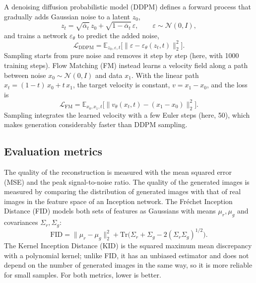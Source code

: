 A denoising diffusion probabilistic model (DDPM) \cite{Ho2020} defines a forward process that gradually adds Gaussian noise to a latent $z_0$,
\begin{equation}
z_t=\sqrt{\bar{\alpha}_t}\,z_0+\sqrt{1-\bar{\alpha}_t}\,\varepsilon,\qquad \varepsilon\sim\mathcal{N}(0,I),
\end{equation}
and trains a network $\varepsilon_\theta$ to predict the added noise,
\begin{equation}
\mathcal{L}_{\mathrm{DDPM}}=\mathbb{E}_{z_0,\varepsilon,t}\big[\lVert\varepsilon-\varepsilon_\theta(z_t,t)\rVert_2^2\big].
\end{equation}
Sampling starts from pure noise and removes it step by step (here, with 1000 training steps). Flow Matching (FM) \cite{Lipman2023} instead learns a velocity field along a path between noise $x_0\sim\mathcal{N}(0,I)$ and data $x_1$. With the linear path $x_t=(1-t)\,x_0+t\,x_1$, the target velocity is constant, $v=x_1-x_0$, and the loss is
\begin{equation}
\mathcal{L}_{\mathrm{FM}}=\mathbb{E}_{x_0,x_1,t}\big[\lVert v_\theta(x_t,t)-(x_1-x_0)\rVert_2^2\big].
\end{equation}
Sampling integrates the learned velocity with a few Euler steps (here, 50), which makes generation considerably faster than DDPM sampling.

\subsection{Evaluation metrics}

The quality of the reconstruction is measured with the mean squared error (MSE) and the peak signal-to-noise ratio. The quality of the generated images is measured by comparing the distribution of generated images with that of real images in the feature space of an Inception network. The Fr\'echet Inception Distance (FID) \cite{Heusel2017} models both sets of features as Gaussians with means $\mu_r,\mu_g$ and covariances $\Sigma_r,\Sigma_g$:
\begin{equation}
\mathrm{FID}=\lVert\mu_r-\mu_g\rVert_2^2+\mathrm{Tr}\!\big(\Sigma_r+\Sigma_g-2(\Sigma_r\Sigma_g)^{1/2}\big).
\end{equation}
The Kernel Inception Distance (KID) \cite{Binkowski2018} is the squared maximum mean discrepancy with a polynomial kernel; unlike FID, it has an unbiased estimator and does not depend on the number of generated images in the same way, so it is more reliable for small samples. For both metrics, lower is better.

